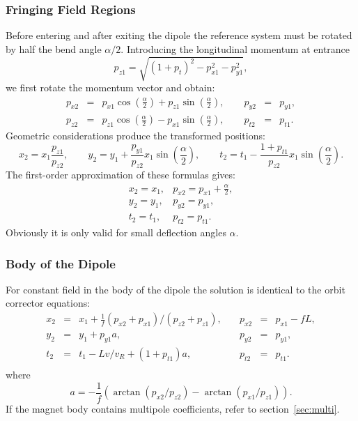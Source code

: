 \documentclass{report}
\begin{document}
\subsubsection{Fringing Field Regions}
Before entering and after exiting the dipole the reference system must
be rotated by half the bend angle $\alpha/2$.
Introducing the longitudinal momentum at entrance
\begin{equation}
  p_{z1} = \sqrt{(1+p_t)^2-p_{x1}^2-p_{y1}^2},
\end{equation}
we first rotate the momentum vector and obtain:
\begin{equation}
  \begin{array}{lcllcl}
    p_{x2}&=&p_{x1}\cos(\frac{\alpha}{2})+p_{z1}\sin(\frac{\alpha}{2}),
    \qquad p_{y2}&=&p_{y1}, \\
    p_{z2}&=&p_{z1}\cos(\frac{\alpha}{2})-p_{x1}\sin(\frac{\alpha}{2}),
    \qquad p_{t2}&=&p_{t1}.
  \end{array}
\end{equation}
Geometric considerations produce the transformed positions:
\begin{equation}
  x_2=x_1 \frac{p_{z1}}{p_{z2}}, \qquad
  y_2=y_1+\frac{p_{y1}}{p_{z2}} x_1\sin(\frac{\alpha}{2}), \qquad
  t_2=t_1-\frac{1+p_{t1}}{p_{z2}} x_1\sin(\frac{\alpha}{2}).
\end{equation}
The first-order approximation of these formulas gives:
\begin{equation}
  \begin{array}{ll}
    x_2=x_1, & p_{x2} = p_{x1} + \frac{\alpha}{2}, \\
    y_2=y_1, & p_{y2} = p_{y1}, \\
    t_2=t_1, & p_{t2} = p_{t1}.
  \end{array}
\end{equation}
Obviously it is only valid for small deflection angles $\alpha$.


\subsubsection{Body of the Dipole}
For constant field in the body of the dipole the solution is identical
to the orbit corrector equations:
\begin{equation}
  \begin{array}{lcllcl}
    x_2&=&x_1+\frac{1}{f} (p_{x2}+p_{x1})/(p_{z2}+p_{z1}), \quad &
    p_{x2}&=&p_{x1}-fL, \\
    y_2&=&y_1+p_{y1} a,            & p_{y2}&=&p_{y1}, \\
    t_2&=&t_1-Lv/v_R+(1+p_{t1}) a, & p_{t2}&=&p_{t1}. \\
  \end{array}
\end{equation}
where
\begin{equation}
  a=-\frac{1}{f}\left(\arctan(p_{x2}/p_{z2})-\arctan(p_{x1}/p_{z1})\right).
\end{equation}
If the magnet body contains multipole coefficients,
refer to section~\ref{sec:multi}.
\end{document}
